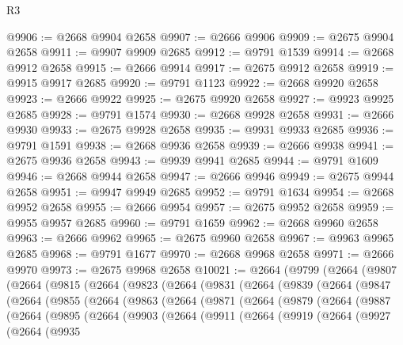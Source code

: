 \begin{lexlean}{R3}
\begin{coremodule}
@9906 := @2668 @9904 @2658
@9907 := @2666 @9906
@9909 := @2675 @9904 @2658
@9911 := @9907 @9909 @2685
@9912 := @9791 @1539
@9914 := @2668 @9912 @2658
@9915 := @2666 @9914
@9917 := @2675 @9912 @2658
@9919 := @9915 @9917 @2685
@9920 := @9791 @1123
@9922 := @2668 @9920 @2658
@9923 := @2666 @9922
@9925 := @2675 @9920 @2658
@9927 := @9923 @9925 @2685
@9928 := @9791 @1574
@9930 := @2668 @9928 @2658
@9931 := @2666 @9930
@9933 := @2675 @9928 @2658
@9935 := @9931 @9933 @2685
@9936 := @9791 @1591
@9938 := @2668 @9936 @2658
@9939 := @2666 @9938
@9941 := @2675 @9936 @2658
@9943 := @9939 @9941 @2685
@9944 := @9791 @1609
@9946 := @2668 @9944 @2658
@9947 := @2666 @9946
@9949 := @2675 @9944 @2658
@9951 := @9947 @9949 @2685
@9952 := @9791 @1634
@9954 := @2668 @9952 @2658
@9955 := @2666 @9954
@9957 := @2675 @9952 @2658
@9959 := @9955 @9957 @2685
@9960 := @9791 @1659
@9962 := @2668 @9960 @2658
@9963 := @2666 @9962
@9965 := @2675 @9960 @2658
@9967 := @9963 @9965 @2685
@9968 := @9791 @1677
@9970 := @2668 @9968 @2658
@9971 := @2666 @9970
@9973 := @2675 @9968 @2658
@10021 := @2664
    (@9799
      (@2664
        (@9807
          (@2664
            (@9815
              (@2664
                (@9823
                  (@2664
                    (@9831
                      (@2664
                        (@9839
                          (@2664
                            (@9847
                              (@2664
                                (@9855
                                  (@2664
                                    (@9863
                                      (@2664
                                        (@9871
                                          (@2664
                                            (@9879
                                              (@2664
                                                (@9887
                                                  (@2664
                                                    (@9895
                                                      (@2664
                                                        (@9903
                                                          (@2664
                                                            (@9911
                                                              (@2664
                                                                (@9919
                                                                  (@2664
                                                                    (@9927
                                                                      (@2664
                                                                        (@9935

\end{coremodule}
\end{lexlean}
